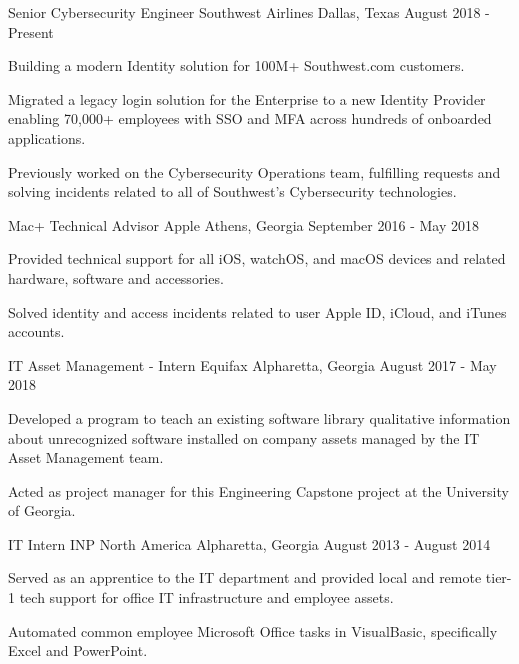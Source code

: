 \begin{cventries}
  \cventry
    {Senior Cybersecurity Engineer}
    {Southwest Airlines}
    {Dallas, Texas}
    {August 2018 - Present}
    {
      \begin{cvitems}
        \item {Building a modern Identity solution for 100M+ Southwest.com customers.}
        \item {Migrated a legacy login solution for the Enterprise to a new Identity Provider enabling 70,000+ employees with SSO and MFA across hundreds of onboarded applications.}
        \item {Previously worked on the Cybersecurity Operations team, fulfilling requests and solving incidents related to all of Southwest's Cybersecurity technologies.}
      \end{cvitems}
    }
  \cventry
    {Mac+ Technical Advisor}
    {Apple}
    {Athens, Georgia}
    {September 2016 - May 2018}
    {
      \begin{cvitems}
        \item {Provided technical support for all iOS, watchOS, and macOS devices and related hardware, software and accessories.}
        \item {Solved identity and access incidents related to user Apple ID, iCloud, and iTunes accounts.}
      \end{cvitems}
    }  
  \cventry
    {IT Asset Management - Intern}
    {Equifax}
    {Alpharetta, Georgia}
    {August 2017 - May 2018}
    {
      \begin{cvitems}
        \item {Developed a program to teach an existing software library qualitative information about unrecognized software installed on company assets managed by the IT Asset Management team.}
        \item {Acted as project manager for this Engineering Capstone project at the University of Georgia.}
      \end{cvitems}
    }
  \cventry
    {IT Intern}
    {INP North America}
    {Alpharetta, Georgia}
    {August 2013 - August 2014}
    {
      \begin{cvitems}
        \item {Served as an apprentice to the IT department and provided local and remote tier-1 tech support for office IT infrastructure and employee assets.}
        \item {Automated common employee Microsoft Office tasks in VisualBasic, specifically Excel and PowerPoint.}
      \end{cvitems}
    }
\end{cventries}